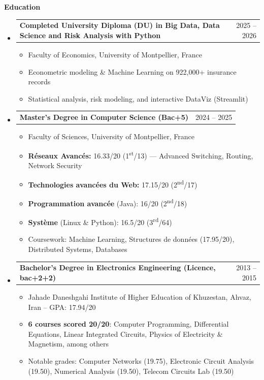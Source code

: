 \documentclass[11pt,a4paper]{article}
\makeatletter
\newcommand{\itemspace}{\vspace{0.4em}}
\newcommand{\sectionspace}{\itemspace}
\newcommand{\subspace}{\vspace{0.5em}}
\newcommand{\cvsection}[1]{
    \sectionspace
    \noindent\textcolor{primary}{\Large \textbf{#1}} \textcolor{primary}{\hrulefill}
    \par\vspace{0.4em}
}
\newcommand{\headerrow}[2]{
    \begin{tabular*}{\linewidth}{l@{\extracolsep{\fill}}r}
    #1 & \textcolor{primary}{#2} \\
    \end{tabular*}
}
\makeatother
\begin{document}
\cvsection{Education}
\begin{itemize}[leftmargin=1em, label={}]
    \item
    \headerrow{\textbf{Completed University Diploma (DU) in Big Data, Data Science and Risk Analysis with Python}}{2025 -- 2026}
    \begin{itemize}[leftmargin=1.5em, label=$\bullet$, nosep]
        \item Faculty of Economics, University of Montpellier, France
        \item Econometric modeling \& Machine Learning on 922,000+ insurance records
        \item Statistical analysis, risk modeling, and interactive DataViz (Streamlit)
    \end{itemize}

    \subspace 
    \item
    \headerrow{\textbf{Master's Degree in Computer Science (Bac+5)}}{2024 -- 2025}
    \begin{itemize}[leftmargin=1.5em, label=$\bullet$, nosep]
        \item Faculty of Sciences, University of Montpellier, France
        \item \textbf{R\'{e}seaux Avanc\'{e}s:} 16.33/20 (1\textsuperscript{st}/13) — Advanced Switching, Routing, Network Security
        \item \textbf{Technologies avanc\'{e}es du Web:} 17.15/20 (2\textsuperscript{nd}/17)
        \item \textbf{Programmation avanc\'{e}e} (Java): 16/20 (2\textsuperscript{nd}/18)
        \item \textbf{Syst\`{e}me} (Linux \& Python): 16.5/20 (3\textsuperscript{rd}/64)
        \item Coursework: Machine Learning, Structures de donn\'{e}es (17.95/20), Distributed Systems, Databases
    \end{itemize}

    \subspace 
    \item
    \headerrow{\textbf{Bachelor's Degree in Electronics Engineering (Licence, bac+2+2)}}{2013 -- 2015}
    \begin{itemize}[leftmargin=1.5em, label=$\bullet$, nosep]
        \item Jahade Daneshgahi Institute of Higher Education of Khuzestan, Ahvaz, Iran -- GPA: 17.94/20
        \item \textbf{6 courses scored 20/20}: Computer Programming, Differential Equations, Linear Integrated Circuits, Physics of Electricity \& Magnetism, among others
        \item Notable grades: Computer Networks (19.75), Electronic Circuit Analysis (19.50), Numerical Analysis (19.50), Telecom Circuits Lab (19.50)
    \end{itemize}
\end{itemize}
\end{document}
